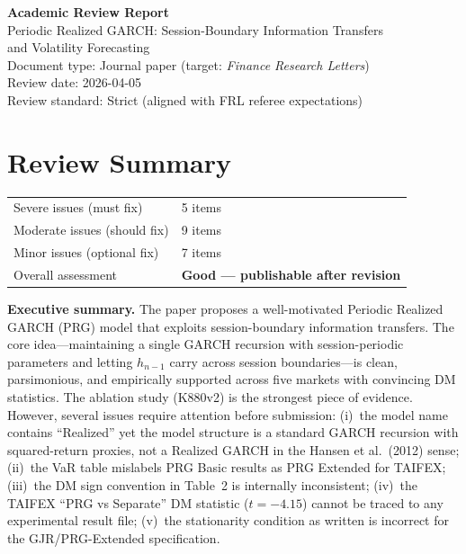 \documentclass[12pt,a4paper]{article}
\begin{document}
\begin{center}
{\Large\bfseries Academic Review Report}\\[0.5em]
{\large Periodic Realized GARCH: Session-Boundary Information Transfers\\and Volatility Forecasting}\\[0.5em]
{\normalsize Document type: Journal paper (target: \emph{Finance Research Letters})}\\
{\normalsize Review date: 2026-04-05}\\
{\normalsize Review standard: Strict (aligned with FRL referee expectations)}
\end{center}

\bigskip

\section*{Review Summary}

\begin{tabular}{ll}
\textcolor{errorred}{Severe issues (must fix)} & 5 items \\
\textcolor{warncolor}{Moderate issues (should fix)} & 9 items \\
Minor issues (optional fix) & 7 items \\
Overall assessment & \textbf{Good --- publishable after revision} \\
\end{tabular}

\medskip
\noindent
\textbf{Executive summary.}
The paper proposes a well-motivated Periodic Realized GARCH (PRG) model that exploits session-boundary information transfers. The core idea---maintaining a single GARCH recursion with session-periodic parameters and letting $h_{n-1}$ carry across session boundaries---is clean, parsimonious, and empirically supported across five markets with convincing DM statistics. The ablation study (K880v2) is the strongest piece of evidence. However, several issues require attention before submission: (i)~the model name contains ``Realized'' yet the model structure is a standard GARCH recursion with squared-return proxies, not a Realized GARCH in the Hansen et al.\ (2012) sense; (ii)~the VaR table mislabels PRG Basic results as PRG Extended for TAIFEX; (iii)~the DM sign convention in Table~2 is internally inconsistent; (iv)~the TAIFEX ``PRG vs Separate'' DM statistic ($t=-4.15$) cannot be traced to any experimental result file; (v)~the stationarity condition as written is incorrect for the GJR/PRG-Extended specification.
\end{document}
